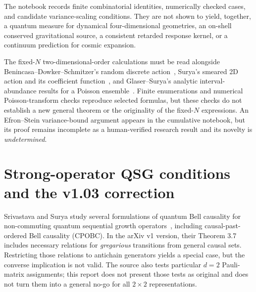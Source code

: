 \documentclass[11pt,a4paper]{article}
\begin{document}
The notebook records finite combinatorial identities, numerically checked cases, and candidate variance-scaling conditions. They are not shown to yield, together, a quantum measure for dynamical four-dimensional geometries, an on-shell conserved gravitational source, a consistent retarded response kernel, or a continuum prediction for cosmic expansion.\par\noindent The fixed-$N$ two-dimensional-order calculations must be read alongside Benincasa--Dowker--Schmitzer's random discrete action~\cite{BenincasaDowkerSchmitzer2011}, Surya's smeared 2D action and its coefficient function~\cite{Surya2012}, and Glaser--Surya's analytic interval-abundance results for a Poisson ensemble~\cite{GlaserSurya2013}. Finite enumerations and numerical Poisson-transform checks reproduce selected formulas, but these checks do not establish a new general theorem or the originality of the fixed-$N$ expressions. An Efron--Stein variance-bound argument appears in the cumulative notebook, but its proof remains incomplete as a human-verified research result and its novelty is \emph{undetermined}.

\section{Strong-operator QSG conditions and the v1.03 correction}
Srivastava and Surya study several formulations of quantum Bell causality for non-commuting quantum sequential growth operators~\cite{SrivastavaSurya2026}, including causal-past-ordered Bell causality (CPOBC). In the arXiv v1 version, their Theorem 3.7 includes necessary relations for \emph{gregarious} transitions from general causal sets. Restricting those relations to antichain generators yields a special case, but the converse implication is not valid. The source also tests particular $d=2$ Pauli-matrix assignments; this report does not present those tests as original and does not turn them into a general no-go for all $2\times2$ representations.
\end{document}
